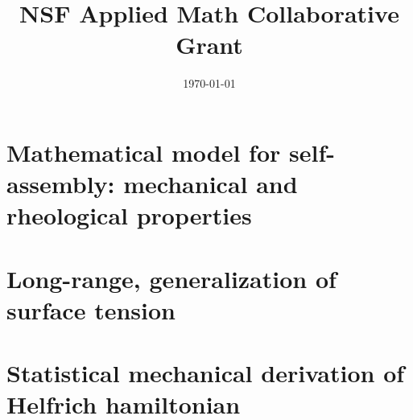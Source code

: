 \documentclass[preprint,11pt]{article}
\title{NSF Applied Math Collaborative Grant}
\author{}
\date{\today}
\begin{document}
\maketitle
\everymath{\displaystyle}

\section{Mathematical model for self-assembly: mechanical and rheological properties}
\section{Long-range, generalization of surface tension}
\section{Statistical mechanical derivation of Helfrich hamiltonian} 
\end{document}
